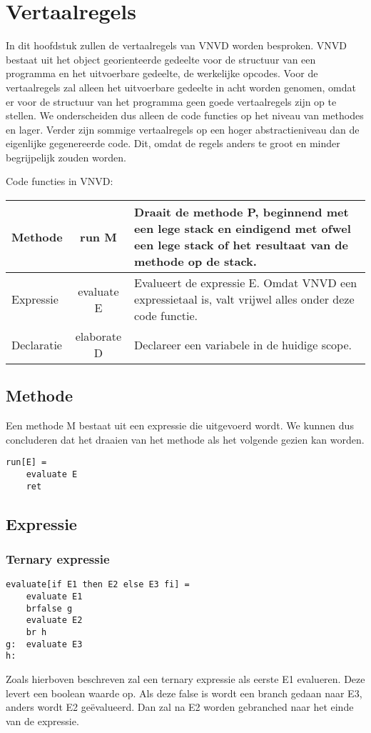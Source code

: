 \section{Vertaalregels}
In dit hoofdstuk zullen de vertaalregels van VNVD worden besproken. VNVD bestaat uit het object georienteerde gedeelte voor de structuur van een programma en het uitvoerbare gedeelte, de werkelijke opcodes. Voor de vertaalregels zal alleen het uitvoerbare gedeelte in acht worden genomen, omdat er voor de structuur van het programma geen goede vertaalregels zijn op te stellen. We onderscheiden dus alleen de code functies op het niveau van methodes en lager. Verder zijn sommige vertaalregels op een hoger abstractieniveau dan de eigenlijke gegenereerde code. Dit, omdat de regels anders te groot en minder begrijpelijk zouden worden.

Code functies in VNVD:

\begin{tabular} { | l | c | p{6cm} | }
\hline
Methode & run M & Draait de methode P, beginnend met een lege stack en eindigend met ofwel een lege stack of het resultaat van de methode op de stack. \\ \hline
Expressie & evaluate E & Evalueert de expressie E. Omdat VNVD een expressietaal is, valt vrijwel alles onder deze code functie. \\ \hline
Declaratie & elaborate D & Declareer een variabele in de huidige scope. \\ \hline
\end{tabular}

\subsection{Methode}
Een methode M bestaat uit een expressie die uitgevoerd wordt. We kunnen dus concluderen dat het draaien van het methode als het volgende gezien kan worden.
\begin{lstlisting}
run[E] =
	evaluate E
	ret
\end{lstlisting}

\subsection{Expressie}
\subsubsection{Ternary expressie}
\begin{lstlisting}
evaluate[if E1 then E2 else E3 fi] =
	evaluate E1
	brfalse g
	evaluate E2
	br h
g:	evaluate E3
h:
\end{lstlisting}
Zoals hierboven beschreven zal een ternary expressie als eerste E1 evalueren. Deze levert een boolean waarde op. Als deze false is wordt een branch gedaan naar E3, anders wordt E2 ge\"evalueerd. Dan zal na E2 worden gebranched naar het einde van de expressie.


